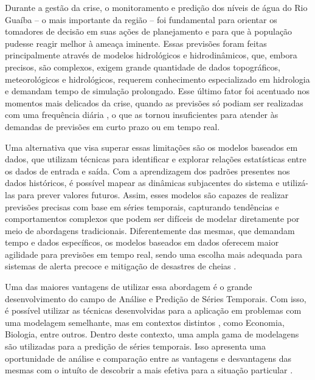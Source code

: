 Durante a gestão da crise, o monitoramento e predição dos níveis de água do Rio Guaíba – o mais importante da região –
foi fundamental para orientar os tomadores de decisão em suas ações de planejamento e para que à população pudesse
reagir melhor à ameaça iminente. Essas previsões foram feitas principalmente através de modelos hidrológicos e
hidrodinâmicos, que, embora precisos, são complexos, exigem grande quantidade de dados topográficos, meteorológicos e
hidrológicos, requerem conhecimento especializado em hidrologia e demandam tempo de simulação prolongado. Esse último
fator foi acentuado nos momentos mais delicados da crise, quando as previsões só podiam ser realizadas com uma
frequência diária \cite{iph}, o que as tornou insuficientes para atender às demandas de previsões em curto prazo ou em
tempo real\cite{atashi}.

Uma alternativa que visa superar essas limitações são os modelos baseados em dados, que utilizam técnicas para
identificar e explorar relações estatísticas entre os dados de entrada e saída. Com a aprendizagem dos padrões presentes
nos dados históricos, é possível mapear as dinâmicas subjacentes do sistema e utilizá-las para prever valores futuros.
Assim, esses modelos são capazes de realizar previsões precisas com base em séries temporais, capturando tendências e
comportamentos complexos que podem ser difíceis de modelar diretamente por meio de abordagens tradicionais.
Diferentemente das mesmas, que demandam tempo e dados específicos, os modelos baseados em dados oferecem maior agilidade
para previsões em tempo real, sendo uma escolha mais adequada para sistemas de alerta precoce e mitigação de desastres
de cheias \cite{ta}.

Uma das maiores vantagens de utilizar essa abordagem é o grande desenvolvimento do campo de Análise e Predição de Séries
Temporais. Com isso, é possível utilizar as técnicas desenvolvidas para a aplicação em problemas com uma modelagem
semelhante, mas em contextos distintos \cite{hyndman}, como Economia, Biologia, entre outros. Dentro deste contexto, uma
ampla gama de modelagens são utilizadas para a predição de séries temporais. Isso apresenta uma oportunidade de análise
e comparação entre as vantagens e desvantagens das mesmas com o intuíto de descobrir a mais efetiva para a situação
particular \cite{makridakis}\cite{morales}.

